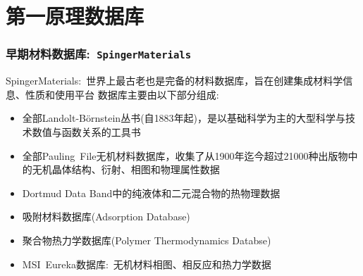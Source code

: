 \section{第一原理数据库}
\frame
{
	\frametitle{早期材料数据库:~\tt{SpingerMaterials}}
\textrm{SpingerMaterials}:~世界上最古老也是完备的材料数据库，旨在创建集成材料学信息、性质和使用平台
\vskip 3pt
数据库主要由以下部分组成:
\begin{itemize}
	\item 全部\textrm{Landolt-B{\"o}rnstein}丛书(自\textrm{1883}年起)，是以基础科学为主的大型科学与技术数值与函数关系的工具书
	\item 全部\textrm{Pauling~File}无机材料数据库，收集了从\textrm{1900}年迄今超过\textrm{21000}种出版物中的无机晶体结构、衍射、相图和物理属性数据
	\item \textrm{Dortmud Data Band}中的纯液体和二元混合物的热物理数据
	\item 吸附材料数据库\textrm{(Adsorption Database)}
	\item 聚合物热力学数据库\textrm{(Polymer Thermodynamics Databse)}
	\item \textrm{MSI~Eureka}数据库:~无机材料相图、相反应和热力学数据
\end{itemize}
}

